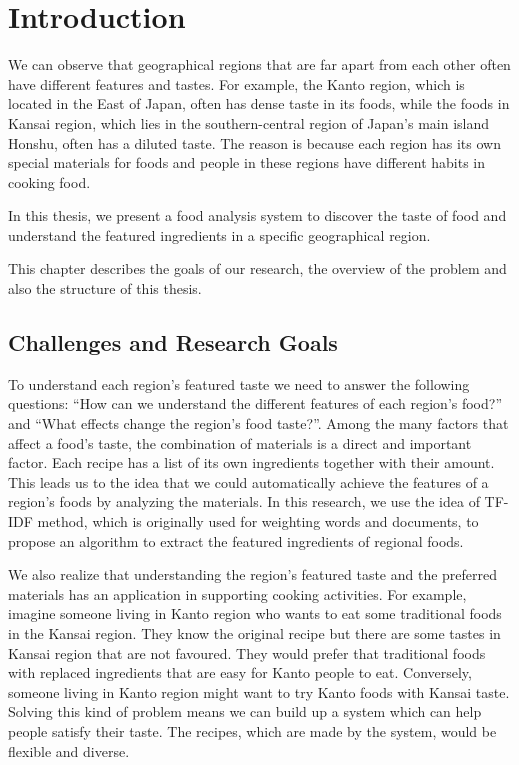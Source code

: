 \chapter{Introduction}\label{chap:intro}

We can observe that geographical regions that are far apart from each other often have different features and tastes. For example, the Kanto region, which is located in the East of Japan, often has dense taste in its foods, while the foods in Kansai region, which lies in the southern-central region of Japan's main island Honshu, often has a diluted taste. The reason is because each region has its own special materials for foods and people in these regions have different habits in cooking food.

In this thesis, we present a food analysis system to discover the taste of food and understand the featured ingredients in a specific geographical region.

This chapter describes the goals of our research, the overview of the problem and also the structure of this thesis.

\clearpage


\section{Challenges and Research Goals}\label{sec:challenge}

\par To understand each region's featured taste we need to answer the following questions: ``How can we understand the different features of each region's food?'' and ``What effects change the region's food taste?''. Among the many factors that affect a food's taste, the combination of materials is a direct and important factor. Each recipe has a list of its own ingredients together with their amount. This leads us to the idea that we could automatically achieve the features of a region's foods by analyzing the materials. In this research, we use the idea of TF-IDF method, which is originally used for weighting words and documents, to propose an algorithm to extract the featured ingredients of regional foods.  

\par We also realize that understanding the region's featured taste and the preferred materials has an application in supporting cooking activities. For example, imagine someone living in Kanto region who wants to eat some traditional foods in the Kansai region. They know the original recipe but there are some tastes in Kansai region that are not favoured. They would prefer that traditional foods with replaced ingredients that are easy for Kanto people to eat. Conversely, someone living in Kanto region might want to try Kanto foods with Kansai taste. Solving this kind of problem means we can build up a system which can help people satisfy their taste. The recipes, which are made by the system, would be flexible and diverse.

